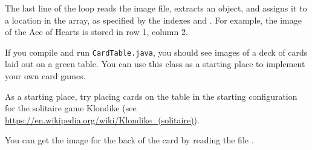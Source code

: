 \begin{exercise}
The last line of the loop reads the image file, extracts an  object, and assigns it to a location in the array, as specified by the indexes  and .
For example, the image of the Ace of Hearts is stored in row 1, column 2.

If you compile and run {\tt CardTable.java}, you should see images of a deck of cards laid out on a green table.
You can use this class as a starting place to implement your own card games.


As a starting place, try placing cards on the table in the starting configuration for the solitaire game Klondike (see \url{https://en.wikipedia.org/wiki/Klondike_(solitaire)}).

You can get the image for the back of the card by reading the file .

\end{exercise}
